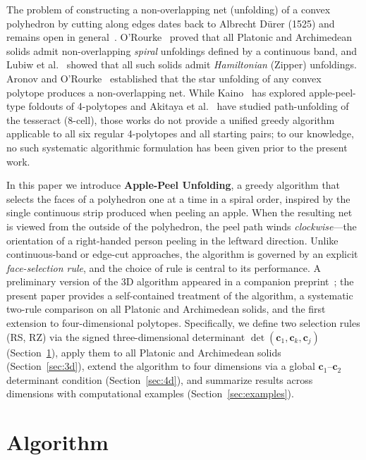 \documentclass[12pt]{article}
\theoremstyle{definition}
\begin{document}
The problem of constructing a non-overlapping net (unfolding) of a convex
polyhedron by cutting along edges dates back to Albrecht D\"{u}rer (1525)
and remains open in general~\cite{Shephard1975,Demaine2007}.
O'Rourke~\cite{ORourke2015} proved that all Platonic and Archimedean solids
admit non-overlapping \emph{spiral} unfoldings defined by a continuous band,
and Lubiw et al.~\cite{Lubiw2010} showed that all such solids admit
\emph{Hamiltonian} (Zipper) unfoldings.
Aronov and O'Rourke~\cite{AronovORourke1992} established that the star
unfolding of any convex polytope produces a non-overlapping net.
While Kaino~\cite{Kaino2019} has explored apple-peel-type foldouts of
4-polytopes and Akitaya et al.~\cite{Akitaya2024} have studied
path-unfolding of the tesseract (8-cell), those works do not provide a
unified greedy algorithm applicable to all six regular 4-polytopes and
all starting pairs; to our knowledge, no such systematic algorithmic
formulation has been given prior to the present work.

In this paper we introduce \textbf{Apple-Peel Unfolding}, a greedy algorithm
that selects the faces of a polyhedron one at a time in a spiral order,
inspired by the single continuous strip produced when peeling an apple.
When the resulting net is viewed from the outside of the polyhedron,
the peel path winds \emph{clockwise}---the orientation of a right-handed
person peeling in the leftward direction.
Unlike continuous-band or edge-cut approaches, the algorithm is governed
by an explicit \emph{face-selection rule}, and the choice of rule is central
to its performance.
A preliminary version of the 3D algorithm appeared in a companion
preprint~\cite{Yoshino2026arXiv}; the present paper provides a
self-contained treatment of the algorithm, a systematic two-rule
comparison on all Platonic and Archimedean solids, and the first
extension to four-dimensional polytopes. 
Specifically, we define two selection rules (RS, RZ) via the signed
three-dimensional determinant $\det(\mathbf{c}_1,\mathbf{c}_k,\mathbf{c}_j)$
(Section~\ref{sec:algorithm}), apply them to all Platonic and Archimedean
solids (Section~\ref{sec:3d}), extend the algorithm to four dimensions via
a global $\mathbf{c}_1$--$\mathbf{c}_2$ determinant condition
(Section~\ref{sec:4d}), and summarize results across dimensions with
computational examples (Section~\ref{sec:examples}).

\section{Algorithm}
\label{sec:algorithm}
\end{document}
